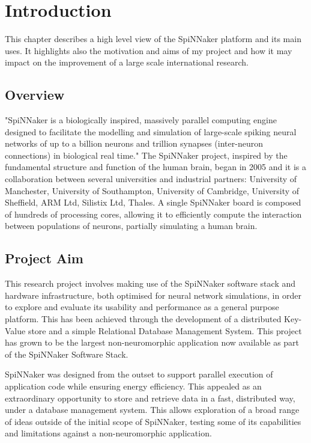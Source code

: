 \chapter{Introduction}
\label{cha:intro}

This chapter describes a high level view of the SpiNNaker platform and its main uses. It highlights also the motivation and aims of my project and how it may impact on the improvement of a large scale international research.

\section{Overview}
\label{sec:overview}

"SpiNNaker is a biologically inspired, massively parallel computing engine designed to facilitate the modelling and simulation of large-scale spiking neural networks of up to a billion neurons and trillion synapses (inter-neuron connections) in biological real time." \cite{painkras} The SpiNNaker project, inspired by the fundamental structure and function of the human brain, began in 2005 and it is a collaboration between several universities and industrial partners: University of Manchester, University of Southampton, University of Cambridge, University of Sheffield, ARM Ltd, Silistix Ltd, Thales. \cite{spinnproject} A single SpiNNaker board is composed of hundreds of processing cores, allowing it to efficiently compute the interaction between populations of neurons, partially simulating a human brain.

\section{Project Aim}
\label{sec:aim}

This research project involves making use of the SpiNNaker software stack and hardware infrastructure, both optimised for neural network simulations, in order to explore and evaluate its usability and performance as a general purpose platform. This has been achieved through the development of a distributed Key-Value store and a simple Relational Database Management System. 
This project has grown to be the largest non-neuromorphic application now available as part of the SpiNNaker Software Stack.

SpiNNaker was designed from the outset to support parallel execution of application code while ensuring energy efficiency. This appealed as an extraordinary opportunity to store and retrieve data in a fast, distributed way, under a database management system. This allows exploration of a broad range of ideas outside of the initial scope of SpiNNaker, testing some of its capabilities and limitations against a non-neuromorphic application.


